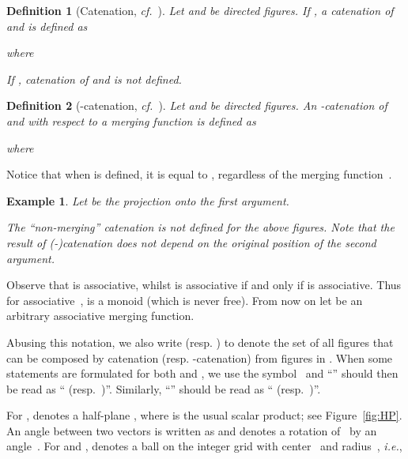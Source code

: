 \documentclass[final,nomarks]{dmtcs-episciences}
\newtheorem{definition}{Definition}
\newtheorem{example}{Example}
\begin{document}
\begin{definition}[Catenation, \textit{cf.}~\cite{KolMoc}]
Let  and  be directed figures.
If ,
a \emph{catenation} of  and  is defined as

where

If , catenation of  and  is not defined.
\end{definition}



\begin{definition}[-catenation, \textit{cf.}~\cite{KolMoc}]
Let  and  be directed figures.
An \emph{-catenation} of  and  with respect to a \emph{merging function}
 is defined as

where

\end{definition}


Notice that when  is defined, it is equal to , regardless
of the merging function~.

\begin{example}
Let  be the projection onto the first argument.

The ``non-merging'' catenation is not defined for the above figures. Note that the result 
of (-)catenation does not depend on the original position of the second argument.
\end{example}


Observe that  is associative, whilst  is
associative if and only if  is associative. Thus for
associative~,  is a
monoid (which is never free).
From now on let  be an arbitrary associative merging
function.

Abusing this notation, we also write  (resp.
) to denote the set of all figures that can be
composed by  catenation (resp.  -catenation)
from figures in . When some statements
are formulated for both  and , we use the
symbol~ and ``'' should then be read as
`` (resp.\ )''. Similarly,
``'' should be read as `` (resp.\
)''.

For ,  denotes a half-plane 
,
where  is the usual scalar product; see Figure~\ref{fig:HP}.
An angle between two vectors  is written as  and 
 denotes a rotation of~ by an angle~.
For  and ,
 denotes a ball on the integer grid with center~ and
radius~, \textit{i.e.},
\end{document}
